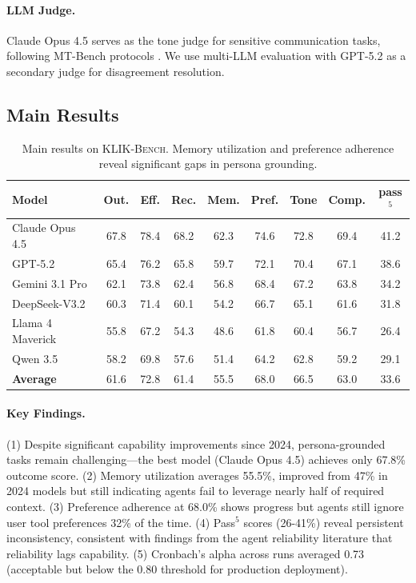 \documentclass{article}
\newcommand{\klikbench}{\textsc{KLIK-Bench}}
\begin{document}
\paragraph{LLM Judge.} Claude Opus 4.5 serves as the tone judge for sensitive communication tasks, following MT-Bench protocols \citep{mtbench2023}. We use multi-LLM evaluation \citep{persodpo2026} with GPT-5.2 as a secondary judge for disagreement resolution.

\subsection{Main Results}

\begin{table}[h]
\centering
\caption{Main results on \klikbench{}. Memory utilization and preference adherence reveal significant gaps in persona grounding.}
\label{tab:main-results}
\small
\begin{tabular}{lcccccccc}
\toprule
\textbf{Model} & \textbf{Out.} & \textbf{Eff.} & \textbf{Rec.} & \textbf{Mem.} & \textbf{Pref.} & \textbf{Tone} & \textbf{Comp.} & \textbf{pass$^5$} \\
\midrule
Claude Opus 4.5 & 67.8 & 78.4 & 68.2 & 62.3 & 74.6 & 72.8 & 69.4 & 41.2 \\
GPT-5.2 & 65.4 & 76.2 & 65.8 & 59.7 & 72.1 & 70.4 & 67.1 & 38.6 \\
Gemini 3.1 Pro & 62.1 & 73.8 & 62.4 & 56.8 & 68.4 & 67.2 & 63.8 & 34.2 \\
DeepSeek-V3.2 & 60.3 & 71.4 & 60.1 & 54.2 & 66.7 & 65.1 & 61.6 & 31.8 \\
Llama 4 Maverick & 55.8 & 67.2 & 54.3 & 48.6 & 61.8 & 60.4 & 56.7 & 26.4 \\
Qwen 3.5 & 58.2 & 69.8 & 57.6 & 51.4 & 64.2 & 62.8 & 59.2 & 29.1 \\
\midrule
\textbf{Average} & 61.6 & 72.8 & 61.4 & 55.5 & 68.0 & 66.5 & 63.0 & 33.6 \\
\bottomrule
\end{tabular}
\end{table}

\paragraph{Key Findings.} (1) Despite significant capability improvements since 2024, persona-grounded tasks remain challenging---the best model (Claude Opus 4.5) achieves only 67.8\% outcome score. (2) Memory utilization averages 55.5\%, improved from 47\% in 2024 models but still indicating agents fail to leverage nearly half of required context. (3) Preference adherence at 68.0\% shows progress but agents still ignore user tool preferences 32\% of the time. (4) Pass$^5$ scores (26-41\%) reveal persistent inconsistency, consistent with findings from the agent reliability literature \citep{agentreliability2026} that reliability lags capability. (5) Cronbach's alpha across runs averaged 0.73 (acceptable but below the 0.80 threshold for production deployment).
\end{document}
